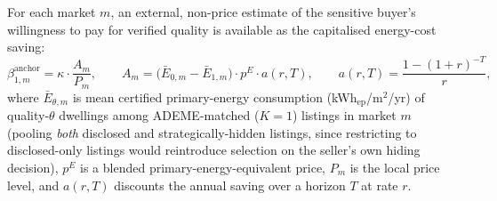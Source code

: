 \label{assum:energy_anchor}
For each market $m$, an external, non-price estimate of the sensitive buyer's willingness to
pay for verified quality is available as the capitalised energy-cost saving:
\begin{equation}
    \beta_{1,m}^{\mathrm{anchor}} = \kappa\cdot\frac{A_m}{P_m}, \qquad
    A_m = \big(\bar E_{0,m}-\bar E_{1,m}\big)\cdot p^E\cdot a(r,T), \qquad
    a(r,T)=\frac{1-(1+r)^{-T}}{r},
    \label{eq:energy_anchor}
\end{equation}
where $\bar E_{\theta,m}$ is mean certified primary-energy consumption (kWh$_{\mathrm{ep}}$/m$^2$/yr)
of quality-$\theta$ dwellings among ADEME-matched ($K=1$) listings in market $m$ (pooling
\emph{both} disclosed and strategically-hidden listings, since restricting to disclosed-only
listings would reintroduce selection on the seller's own hiding decision), $p^E$ is a
blended primary-energy-equivalent price, $P_m$ is the local price level, and $a(r,T)$ discounts
the annual saving over a horizon $T$ at rate $r$.

